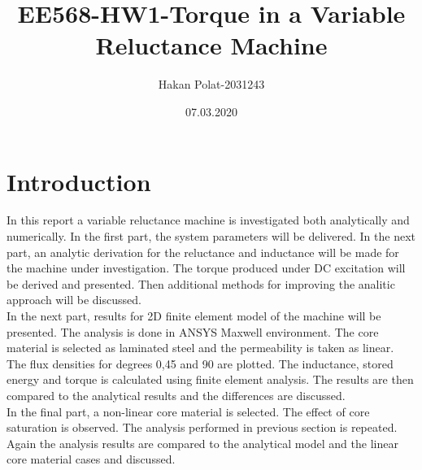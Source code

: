 \documentclass{article}
\title{EE568-HW1-Torque in a Variable Reluctance Machine}
\author{Hakan Polat-2031243 }
\date{07.03.2020}
\begin{document}
\maketitle

\section{Introduction}
In this report a variable reluctance machine is investigated both analytically and numerically. In the first part, the system parameters will be delivered. In the next part, an analytic derivation for the reluctance and inductance will be made for the machine under investigation. The torque produced under DC excitation will be derived and presented. Then additional methods for improving the analitic approach will be discussed.\\
In the next part, results for 2D finite element model of the machine will be presented. The analysis is done in ANSYS Maxwell environment. The core material is selected as laminated steel and the permeability is taken as linear. The flux densities for degrees 0,45 and 90 are plotted. The inductance, stored energy and torque is calculated using finite element analysis. The results are then compared to the analytical results and the differences are discussed. \\
In the final part, a non-linear core material is selected. The effect of core saturation is observed. The analysis performed in previous section is repeated. Again the analysis results are compared to the analytical model and the linear core material cases and discussed.
\end{document}
